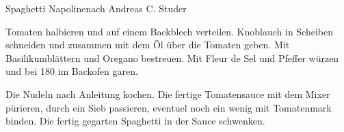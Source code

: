\begin{recipe}{Spaghetti Napoline}{nach Andreas C. Studer}
  \inglist

  \steps
  Tomaten halbieren und auf einem Backblech verteilen. Knoblauch in Scheiben schneiden und
  zusammen mit dem Öl über die Tomaten geben. Mit Basilikumblättern und Oregano bestreuen.
  Mit Fleur de Sel und Pfeffer würzen und bei 180 \celsius im Backofen garen.

  Die Nudeln nach Anleitung kochen. Die fertige Tomatensauce mit dem Mixer pürieren, durch
  ein Sieb passieren, eventuel noch ein wenig mit Tomatenmark binden. Die fertig gegarten
  Spaghetti in der Sauce schwenken.

\end{recipe}
